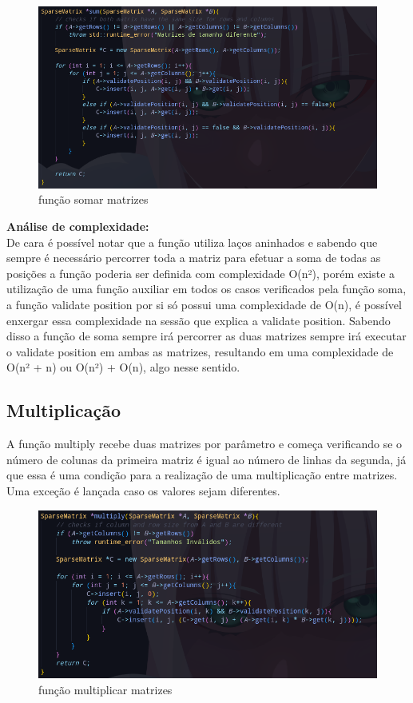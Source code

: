 \documentclass[a4paper,12pt]{article}
\begin{document}
\begin{figure}[H]
\centering
\includegraphics[width=1\textwidth]{Imagens/main/soma-matriz.png}
\caption{\label{fig:sum} função somar matrizes}
\end{figure}

\textbf{ Análise de complexidade:}\\
De cara é possível notar que a função utiliza laços aninhados e sabendo que sempre é necessário percorrer toda a matriz para efetuar a soma de todas as posições a função poderia ser definida com complexidade O(n²), porém existe a utilização de uma função auxiliar em todos os casos verificados pela função soma, a função validate position por si só possui uma complexidade de O(n), é possível enxergar essa complexidade na sessão que explica a validate position. Sabendo disso a função de soma sempre irá percorrer as duas matrizes sempre irá executar o validate position em ambas as matrizes, resultando em uma complexidade de O(n² + n) ou O(n²) + O(n), algo nesse sentido.

\subsection{Multiplicação}
A função multiply recebe duas matrizes por parâmetro e começa verificando se o número de colunas da primeira matriz é igual ao número de linhas da segunda, já que essa é uma condição para a realização de uma multiplicação entre matrizes. Uma exceção é lançada caso os valores sejam diferentes.

\begin{figure}[H]
\centering
\includegraphics[width=1\textwidth]{Imagens/main/multiplicacao-matriz.png}
\caption{\label{fig:mult} função multiplicar matrizes}
\end{figure}
\end{document}
